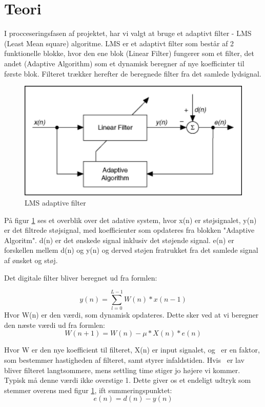 \graphicspath{{Chapters/Indledning/}}


\section{Teori}
I procceseringsfasen af projektet, har vi valgt at bruge et adaptivt filter - LMS (Least Mean square) algoritme. LMS er et adaptivt filter som består af 2 funktionelle blokke, hvor den ene blok (Linear Filter) fungerer som et filter, det andet (Adaptive Algorithm) som et dynamisk beregner af nye koefficinter til første blok.  Filteret trækker herefter de beregnede filter fra det samlede lydsignal. 
   

\begin{figure}[H]
	\centering
	\includegraphics[width = 400pt]{Img/Figures}
	\caption{LMS adaptive filter}
	\label{fig:LMS_filter}
\end{figure}

På figur \ref{fig:LMS_filter} ses et overblik over det adative system, hvor x(n) er støjsignalet, y(n) er det filtrede støjsignal, med koefficienter som opdateres fra blokken "Adaptive Algoritm". d(n) er det ønskede signal inklusiv det støjende signal. e(n) er forskellen mellem d(n) og y(n) og derved støjen fratrukket fra det samlede signal af ønsket og støj.\cite{Teori}  \newline 


Det digitale filter bliver beregnet ud fra formlen:

\begin{equation}
  y(n) = \displaystyle\sum_{l=0}^{L-1} W(n)*x(n-1)
\end{equation}
Hvor W(n) er den værdi, som dynamisk opdateres. Dette sker ved at vi beregner den næste værdi ud fra formlen: 
\begin{equation}
  W(n+1) = W(n)-\mu *X(n)*e(n)
\end{equation}

Hvor W er den nye koefficient til filteret, X(n) er input signalet, og \textmu\ er en faktor, som bestemmer hastigheden af filteret, samt styrer infaldstiden. Hvis \textmu\ er lav bliver filteret langtsommere, mens settling time stiger jo højere vi kommer. Typisk må denne værdi ikke overstige 1. 
\newline
Dette giver os et endeligt udtryk som stemmer overens med figur \ref{fig:LMS_filter}, ift summeringspunktet: 
\begin{equation}
  e(n) = d(n)-y(n)
\end{equation} 
